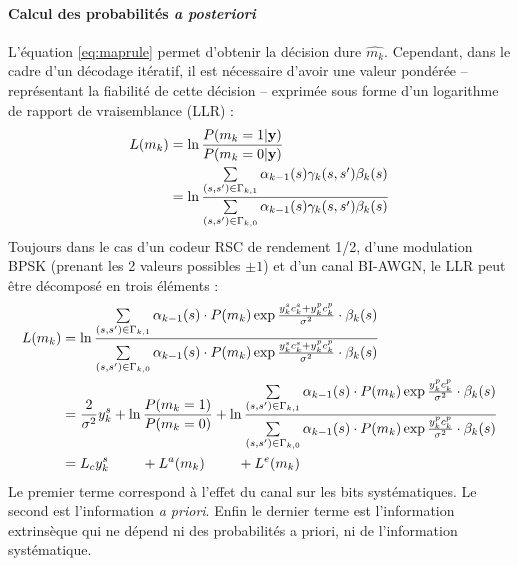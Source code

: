 \paragraph*{Calcul des probabilités \textit{a posteriori}} L'équation \ref{eq:maprule} permet d'obtenir la décision dure $\hat{m_k}$. Cependant, dans le cadre d'un décodage itératif, il est nécessaire d'avoir une valeur pondérée -- représentant la fiabilité de cette décision -- exprimée sous forme d'un logarithme de rapport de vraisemblance (LLR) : 
\begin{align}
	L(m_k) & = \ln\frac{P(m_k=1|\mathbf{y})}{P(m_k=0|\mathbf{y})}                                                                                                                           \\
	       & = \ln\frac{\sum\limits_{(s,s')\in\Gamma_{k,1}} \alpha_{k-1}(s) \gamma_k(s,s') \beta_k(s)}{\sum\limits_{(s,s')\in\Gamma_{k,0}}\alpha_{k-1}(s) \gamma_k(s,s') \beta_k(s)} \notag 
\end{align}
Toujours dans le cas d'un codeur RSC de rendement 1/2, d'une modulation BPSK (prenant les 2 valeurs possibles $\pm1$) et d'un canal BI-AWGN, le LLR peut être décomposé en trois éléments :
\begin{align}
	\label{eq:app}
	L(m_k) & =  \ln\frac{\sum\limits_{(s,s')\in\Gamma_{k,1}} \alpha_{k-1}(s) \cdot P(m_k) \exp \frac{y_k^sc_k^s+y_k^pc_k^p}{\sigma^2} \cdot \beta_k(s)}{\sum\limits_{(s,s')\in\Gamma_{k,0}} \alpha_{k-1}(s)\cdot  P(m_k) \exp \frac{y_k^sc_k^s+y_k^pc_k^p}{\sigma^2} \cdot \beta_k(s)}        \notag                             \\
	       & =  \frac{2}{\sigma^2}y_k^s + \ln \frac{P(m_k=1)}{P(m_k=0)} + \ln\frac{\sum\limits_{(s,s')\in\Gamma_{k,1}} \alpha_{k-1}(s) \cdot P(m_k) \exp \frac{y_k^pc_k^p}{\sigma^2} \cdot \beta_k(s)}{\sum\limits_{(s,s')\in\Gamma_{k,0}} \alpha_{k-1}(s)\cdot  P(m_k) \exp \frac{y_k^pc_k^p}{\sigma^2} \cdot \beta_k(s)}\notag \\
	       & = L_cy_k^s\qquad~ + L^a(m_k)\qquad~ + L^e(m_k)                                                                                                                                                                                                                                                                      
\end{align}
Le premier terme correspond à l'effet du canal sur les bits systématiques. Le second est l'information \textit{a priori}. Enfin le dernier terme est l'information extrinsèque qui ne dépend ni des probabilités a priori, ni de l'information systématique.


